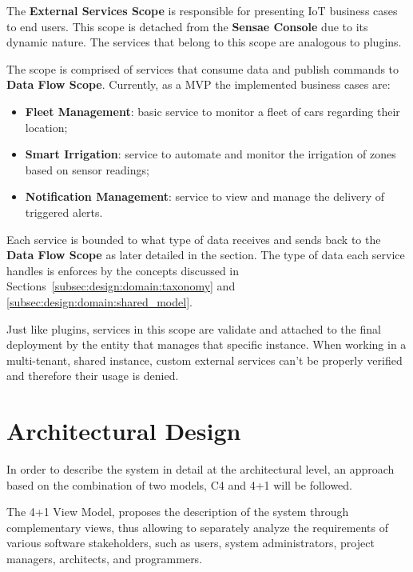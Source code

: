 The \textbf{External Services Scope} is responsible for presenting \gls{IoT} business cases to end users. This scope is detached from the \textbf{Sensae Console} due to its dynamic nature. The services that belong to this scope are analogous to plugins.

The scope is comprised of services that consume data and publish commands to \textbf{Data Flow Scope}. Currently, as a \gls{MVP} the implemented business cases are:

\begin{itemize}
   \item \textbf{Fleet Management}: basic service to monitor a fleet of cars regarding their location;
   \item \textbf{Smart Irrigation}: service to automate and monitor the irrigation of zones based on sensor readings;
   \item \textbf{Notification Management}: service to view and manage the delivery of triggered alerts.
\end{itemize}

Each service is bounded to what type of data receives and sends back to the \textbf{Data Flow Scope} as later detailed in the  section. The type of data each service handles is enforces by the concepts discussed in Sections~\ref{subsec:design:domain:taxonomy} and \ref{subsec:design:domain:shared_model}.

Just like plugins, services in this scope are validate and attached to the final deployment by the entity that manages that specific instance. When working in a multi-tenant, shared instance, custom external services can't be properly verified and therefore their usage is denied.

\section{Architectural Design}
\label{sec:design:architecture}

In order to describe the system in detail at the architectural level, an approach based on the combination of two models, C4 \parencite{c4model-site} and 4+1 \parencite{4plus1model} will be followed.

The 4+1 View Model, proposes the description of the system through complementary views, thus allowing to separately analyze the requirements of various software stakeholders, such as users, system administrators, project managers, architects, and programmers.

